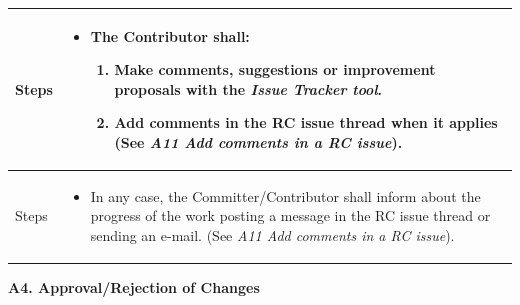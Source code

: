 \documentclass{template/openetcs_article}
\begin{document}
\begin{flushleft}
\begin{supertabular}{|m{2cm}|m{13cm}|}
Steps &
\begin{itemize}
\item The Contributor shall:
\begin{enumerate}
\item Make comments, suggestions or improvement proposals with the {\it Issue Tracker tool}.
\item Add comments in the RC issue thread when it applies (See {\it A11 Add comments in a RC issue}).
\end{enumerate}
\end{itemize}
\\\hline
Steps &
\begin{itemize}
\item In any case, the Committer/Contributor shall inform about the progress of the work posting a message in the RC issue thread or sending an e-mail. (See {\it A11 Add comments in a RC issue}).
\end{itemize}
\\\hline
\end{supertabular}
\end{flushleft}


\textbf{A4. Approval/Rejection of Changes}
\end{document}
